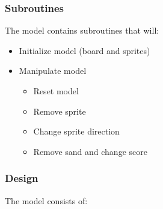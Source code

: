 \documentclass[]{article}
\begin{document}
\subsubsection{Subroutines}\label{subroutines}

The model contains subroutines that will:

\begin{itemize}
\itemsep1pt\parskip0pt
\item
  Initialize model (board and sprites)
\item
  Manipulate model

  \begin{itemize}
  \itemsep1pt\parskip0pt
  \item
    Reset model
  \item
    Remove sprite
  \item
    Change sprite direction
  \item
    Remove sand and change score
  \end{itemize}
\end{itemize}

\subsubsection{Design}\label{design}

The model consists of:
\end{document}
